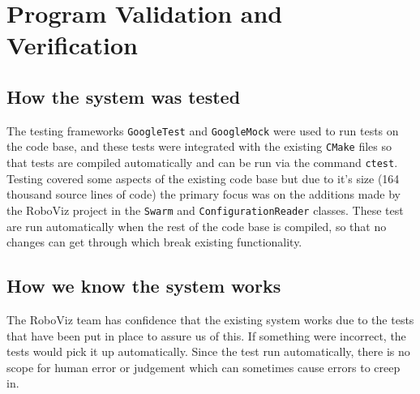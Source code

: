 \documentclass[11pt,a4paper]{article}
\begin{document}
\section{Program Validation and Verification}
\label{s:progr-valid-verif}
%
%
%

\subsection{How the system was tested}
The testing frameworks \texttt{GoogleTest} and \texttt{GoogleMock} were used to
run tests on the code base, and these tests were integrated with the existing
\texttt{CMake} files so that tests are compiled automatically and can be run
via the command \texttt{ctest}. Testing covered some aspects of the existing
code base but due to it's size (164 thousand source lines of code) the primary
focus was on the additions made by the RoboViz project in the \texttt{Swarm}
and \texttt{ConfigurationReader} classes. These test are run automatically when
the rest of the code base is compiled, so that no changes can get through which
break existing functionality.


\subsection{How we know the system works}
The RoboViz team has confidence that the existing system works due to the tests
that have been put in place to assure us of this. If something were incorrect,
the tests would pick it up automatically. Since the test run automatically,
there is no scope for human error or judgement which can sometimes cause errors
to creep in.
\end{document}

